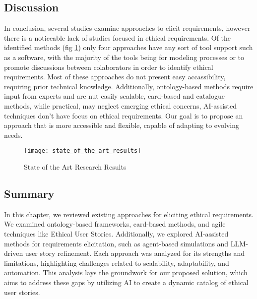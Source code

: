 \subsection{Discussion}
In conclusion, several studies examine approaches to elicit requirements, however there is a noticeable lack of studies focused in ethical requirements. Of the identified methods 
(fig \ref{fig:state_of_the_art_results})  only four approaches have any sort of tool support such as a software, with the majority of the tools being 
for modeling processes or to promote discussions between colaborators in order to identify ethical requirements. Most of these approaches do not present easy accassibility, requiring prior technical 
knowledge. Additionally, ontology-based methods require input from experts and are nut easily scalable, card-based and catalogue methods, while practical, may neglect emerging ethical concerns,
AI-assisted techniques don't have focus on ethical requirements. Our goal is to propose an approach that is more accessible and flexible, capable of adapting to evolving needs.

\begin{figure}[h]
  \centering
  \texttt{[image: state\_of\_the\_art\_results]}
  \caption{State of the Art Research Results}
  \label{fig:state_of_the_art_results}
\end{figure}


\subsection{Summary}
In this chapter, we reviewed existing approaches for eliciting ethical requirements. We examined ontology-based frameworks, card-based methods, and agile techniques like Ethical User Stories. Additionally, we explored 
AI-assisted methods for requirements elicitation, such as agent-based simulations and LLM-driven user story refinement. Each approach was analyzed for its strengths and limitations, highlighting challenges related to 
scalability, adaptability, and automation. This analysis lays the groundwork for our proposed solution, which aims to address these gaps by utilizing AI to create a dynamic catalog of ethical user stories.


